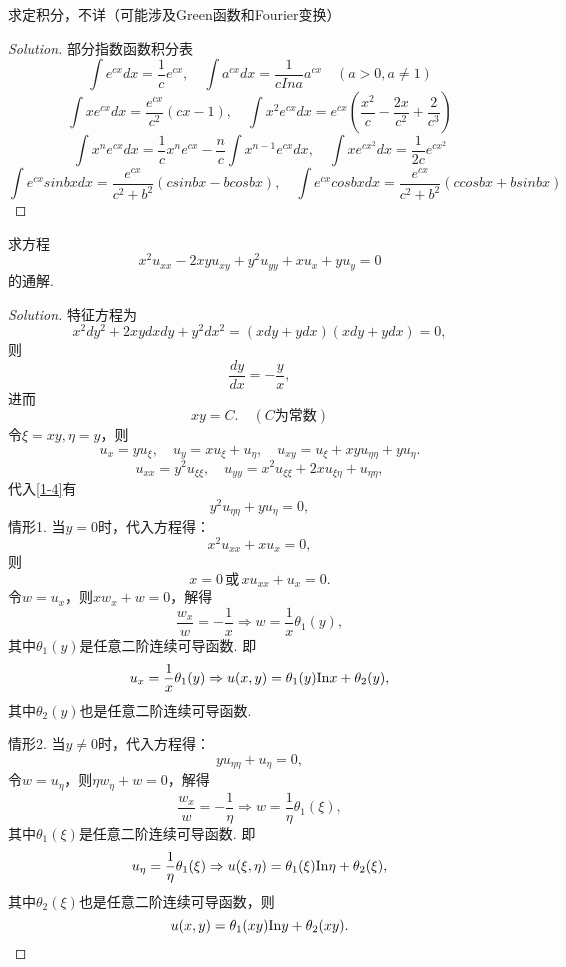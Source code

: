 \documentclass[cn,hazy,blue,14pt,screen]{elegantnote}
\begin{document}
	\begin{example}
		求定积分，不详（可能涉及Green函数和Fourier变换）
	\end{example}

	\begin{proof}[Solution]
	部分指数函数积分表
	$$\int e^{cx} dx=\frac{1}{c}e^{cx},\quad \int a^{cx} dx=\frac{1}{cIna}a^{cx} \quad (a>0,a \ne 1)$$
	$$\int xe^{cx}dx=\frac{e^{cx}}{c^2}(cx-1),\quad \int x^2e^{cx}dx=e^{cx}\left(\frac{x^2}{c}-\frac{2x}{c^2}+\frac{2}{c^3}\right)$$
	$$\int x^ne^{cx}dx=\frac{1}{c}x^ne^{cx}-\frac{n}{c}\int x^{n-1}e^{cx}dx,\quad 
	\int xe^{cx^2}dx=\frac{1}{2c}e^{cx^2}$$
	$$\int e^{cx}sinbx dx=\frac{e^{cx}}{c^2+b^2}(c sinbx-bcosbx),\quad \int e^{cx}cosbx dx=\frac{e^{cx}}{c^2+b^2}(c cosbx+bsinbx)$$
	\end{proof}
	
	\begin{example}
		求方程
		\begin{equation}\label{1-4}
		x^2u_{xx}-2xyu_{xy}+y^2u_{yy}+xu_x+yu_y=0
		\end{equation}
		的通解.
	\end{example}
	\begin{proof}[Solution]
		特征方程为
		$$x^2dy^2+2xy dxdy+y^2dx^2=(xdy+ydx)(xdy+ydx)=0,$$
		则
		$$\frac{dy}{dx}=-\frac{y}{x},$$
		进而$$xy=C.\quad (C \text{为常数})$$
		令$\xi=xy,\eta=y$，则
		$$u_x=yu_\xi,\quad u_y=xu_\xi+u_\eta,\quad u_{xy}=u_{\xi} + xyu_{\eta \eta}+yu_{\eta}.$$
		$$u_{xx}=y^2u_{\xi \xi},\quad u_{yy}=x^2u_{\xi \xi}+2xu_{\xi \eta}+u_{\eta \eta},$$
		代入\eqref{1-4}有
		$$y^2u_{\eta \eta}+yu_\eta=0,$$
		情形1. 当$y=0$时，代入方程得：
		$$x^2u_{xx}+xu_x=0,$$
		则$$x=0 \, \text{或} \, xu_{xx}+u_x=0.$$
		令$w=u_x$，则$xw_x+w=0$，解得
		$$\frac{w_x}{w}=-\frac{1}{x} \Rightarrow w=\frac{1}{x}\theta_1(y),$$
		其中$\theta_1(y)$是任意二阶连续可导函数.
		即$$u_x=\frac{1}{x}\theta_1(y) \Rightarrow u(x,y)=\theta_1(y) {\rm In} x+\theta_2(y),$$
		其中$\theta_2(y)$也是任意二阶连续可导函数.
		
		情形2. 当$y\ne 0$时，代入方程得：
		$$yu_{\eta \eta}+u_{\eta}=0,$$
		令$w=u_\eta$，则$\eta w_\eta +w=0$，解得
		$$\frac{w_x}{w}=-\frac{1}{\eta} \Rightarrow w=\frac{1}{\eta}\theta_1(\xi),$$
		其中$\theta_1(\xi)$是任意二阶连续可导函数.
		即$$u_\eta=\frac{1}{\eta}\theta_1(\xi) \Rightarrow u(\xi,\eta)=\theta_1(\xi) {\rm In} \eta+\theta_2(\xi),$$
		其中$\theta_2(\xi)$也是任意二阶连续可导函数，则
		$$u(x,y)=\theta_1(xy){\rm In}y+\theta_2(xy).$$
		\end{proof}
		
		
\end{document}
